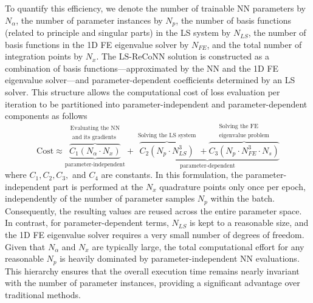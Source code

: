 \documentclass[oneside]{article}
\newcounter{reviewer}
\newcounter{point}[reviewer]
\begin{document}
\noindent To quantify this efficiency, we denote the number of trainable NN parameters by $N_\alpha$, the number of parameter instances by $N_p$, the number of basis functions (related to principle and singular parts) in the LS system by $N_{LS}$, the number of basis functions in the 1D FE eigenvalue solver by $N_{FE}$, and the total number of integration points by $N_x$. The LS-ReCoNN solution is constructed as a combination of basis functions—approximated by the NN and the 1D FE eigenvalue solver—and parameter-dependent coefficients determined by an LS solver. This structure allows the computational cost of loss evaluation per iteration to be partitioned into parameter-independent and parameter-dependent components as follows
\begin{equation}\label{eq2_cost}
    \text{Cost} \approx \overbrace{\underbrace{C_1 (N_\alpha \cdot N_x)}}^{\substack{\text{Evaluating the NN}\\ \text{ and its gradients}}}_{\text{parameter-independent}} + \underbrace{\overbrace{C_2 (N_p \cdot N_{LS}^3)}^{\substack{\text{Solving the LS system}}} + \overbrace{C_3 (N_p \cdot N_{FE}^3\cdot N_s)}^{\substack{\text{Solving the FE }\\ \text{eigenvalue problem}}}}_{\text{parameter-dependent}}
\end{equation}
where $C_1, C_2, C_3,$ and $C_4$ are constants. In this formulation, the parameter-independent part is performed at the $N_x$ quadrature points only once per epoch, independently of the number of parameter samples $N_p$ within the batch. Consequently, the resulting values are reused across the entire parameter space. In contrast, for parameter-dependent terms, $N_{LS}$ is kept to a reasonable size, and the 1D FE eigenvalue solver requires a very small number of degrees of freedom. Given that $N_\alpha$ and $N_x$ are typically large, the total computational effort for any reasonable $N_p$ is heavily dominated by parameter-independent NN evaluations. This hierarchy ensures that the overall execution time remains nearly invariant with the number of parameter instances, providing a significant advantage over traditional methods.
\end{document}
